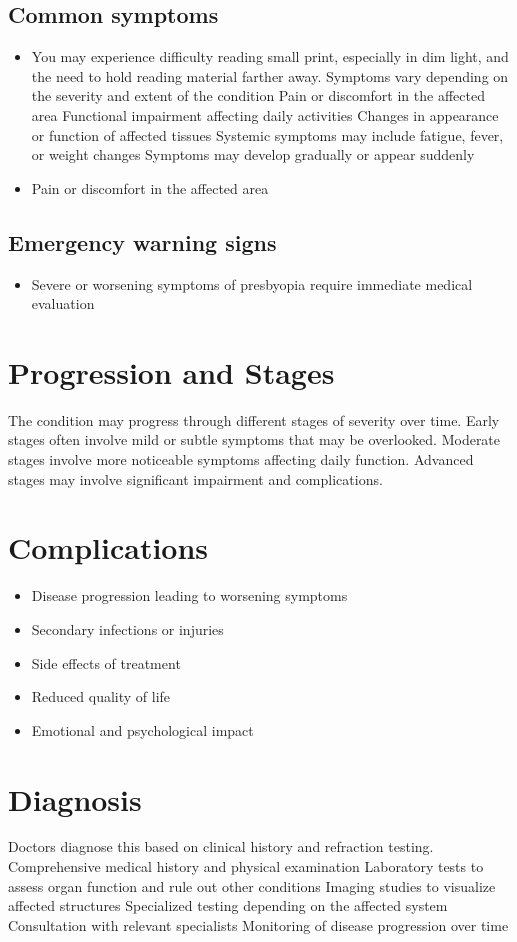 \subsection{Common symptoms}
\begin{itemize}[noitemsep]
  \item You may experience difficulty reading small print, especially in dim light, and the need to hold reading material farther away. Symptoms vary depending on the severity and extent of the condition Pain or discomfort in the affected area Functional impairment affecting daily activities Changes in appearance or function of affected tissues Systemic symptoms may include fatigue, fever, or weight changes Symptoms may develop gradually or appear suddenly
  \item Pain or discomfort in the affected area
  \end{itemize}

\subsection{Emergency warning signs}
\begin{itemize}[noitemsep]
  \item Severe or worsening symptoms of presbyopia require immediate medical evaluation
\end{itemize}
\section{Progression and Stages}
The condition may progress through different stages of severity over time. Early stages often involve mild or subtle symptoms that may be overlooked. Moderate stages involve more noticeable symptoms affecting daily function. Advanced stages may involve significant impairment and complications.
\section{Complications}
\begin{itemize}[noitemsep]
  \item Disease progression leading to worsening symptoms
  \item Secondary infections or injuries
  \item Side effects of treatment
  \item Reduced quality of life
  \item Emotional and psychological impact
\end{itemize}
\section{Diagnosis}
Doctors diagnose this based on clinical history and refraction testing. Comprehensive medical history and physical examination Laboratory tests to assess organ function and rule out other conditions Imaging studies to visualize affected structures Specialized testing depending on the affected system Consultation with relevant specialists Monitoring of disease progression over time

